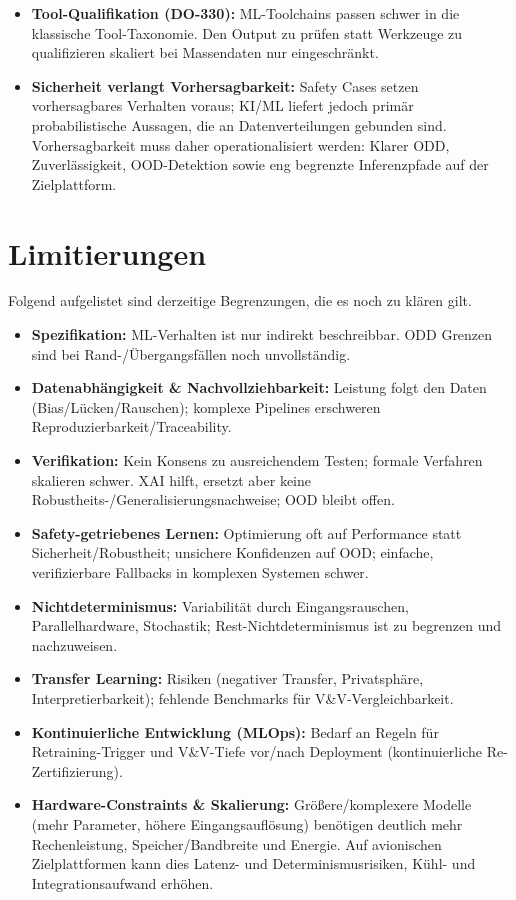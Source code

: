 \begin{itemize}
  \item \textbf{Tool-Qualifikation (DO-330):}
        ML-Toolchains passen schwer in die klassische Tool-Taxonomie. Den Output zu prüfen statt Werkzeuge zu qualifizieren 
        skaliert bei Massendaten nur eingeschränkt.
  \item \textbf{Sicherheit verlangt Vorhersagbarkeit:}
        Safety Cases setzen vorhersagbares Verhalten voraus; KI/ML liefert jedoch primär probabilistische Aussagen, 
        die an Datenverteilungen gebunden sind. Vorhersagbarkeit muss daher operationalisiert werden: Klarer ODD, 
        Zuverlässigkeit, OOD-Detektion sowie eng begrenzte Inferenzpfade auf der Zielplattform.
\end{itemize}

\section{Limitierungen}
Folgend aufgelistet sind derzeitige Begrenzungen, die es noch zu klären gilt.

\medskip
\begin{itemize}
  \item \textbf{Spezifikation:}
        ML-Verhalten ist nur indirekt beschreibbar. ODD Grenzen sind bei Rand-/Übergangsfällen noch unvollständig.
  \item \textbf{Datenabhängigkeit \& Nachvollziehbarkeit:}
        Leistung folgt den Daten (Bias/Lücken/Rauschen); komplexe Pipelines erschweren Reproduzierbarkeit/Traceability.
  \item \textbf{Verifikation:}
        Kein Konsens zu ausreichendem Testen; formale Verfahren skalieren schwer. 
        XAI hilft, ersetzt aber keine Robustheits-/Generalisierungsnachweise; OOD bleibt offen.
  \item \textbf{Safety-getriebenes Lernen:}
        Optimierung oft auf Performance statt Sicherheit/Robustheit; unsichere Konfidenzen auf OOD; 
        einfache, verifizierbare Fallbacks in komplexen Systemen schwer.
  \item \textbf{Nichtdeterminismus:}
        Variabilität durch Eingangsrauschen, Parallelhardware, Stochastik; Rest-Nichtdeterminismus ist zu begrenzen und nachzuweisen.
  \item \textbf{Transfer Learning:}
        Risiken (negativer Transfer, Privatsphäre, Interpretierbarkeit); fehlende Benchmarks für V\&V-Vergleichbarkeit.
  \item \textbf{Kontinuierliche Entwicklung (MLOps):}
        Bedarf an Regeln für Retraining-Trigger und V\&V-Tiefe vor/nach Deployment (kontinuierliche Re-Zertifizierung).
  \item \textbf{Hardware-Constraints \& Skalierung:} 
        Größere/komplexere Modelle (mehr Parameter, höhere Eingangsauflösung) benötigen deutlich mehr 
        Rechenleistung, Speicher/Bandbreite und Energie. Auf avionischen Zielplattformen kann dies Latenz- und 
        Determinismusrisiken, Kühl- und Integrationsaufwand erhöhen.
\end{itemize}






